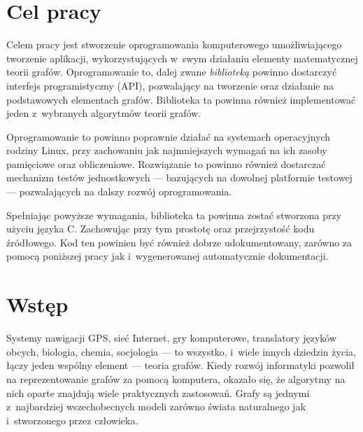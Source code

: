 \documentclass[a4paper,12pt,polish,twoside,openright]{thesis}
\makeatletter
\def\cleardoublepage{\clearpage\if@twoside \ifodd\c@page\else
\hbox{}
\vspace*{\fill}
\vspace{\fill}
\thispagestyle{plain}
\newpage
\if@twocolumn\hbox{}\newpage\fi\fi\fi}
\makeatother
\begin{document}
\stronaTytulowa

\cleardoublepage
\thispagestyle{empty}
\vspace*{\fill}
\begin{flushright}
\begin{minipage}{1.0\textwidth}
\end{minipage}
\end{flushright}

\tableofcontents

\chapter*{Cel pracy}
Celem pracy jest stworzenie oprogramowania komputerowego umożliwiającego tworzenie aplikacji, wykorzystujących w~swym działaniu elementy matematycznej teorii grafów.
Oprogramowanie to, dalej zwane \emph{biblioteką} powinno dostarczyć interfejs programistyczny (API), pozwalający na tworzenie oraz działanie na podstawowych elementach grafów.
Biblioteka ta powinna również implementować jeden z~wybranych algorytmów teorii grafów.

Oprogramowanie to powinno poprawnie działać na systemach operacyjnych rodziny Linux, przy zachowaniu jak najmniejszych wymagań na ich zasoby pamięciowe oraz obliczeniowe.
Rozwiązanie to powinno również dostarczać mechanizm testów jednostkowych --- bazujących na dowolnej platformie testowej --- pozwalających na dalszy rozwój oprogramowania.

Spełniając powyższe wymagania, biblioteka ta powinna zostać stworzona przy użyciu języka C. Zachowując przy tym prostotę oraz przejrzystość kodu źródłowego.
Kod ten powinien być również dobrze udokumentowany, zarówno za pomocą poniższej pracy jak i~wygenerowanej automatycznie dokumentacji.

\chapter*{Wstęp}
Systemy nawigacji GPS, sieć Internet, gry komputerowe, translatory języków obcych, biologia, chemia, socjologia --- to wszystko, i~wiele innych dziedzin życia, łączy jeden wspólny element --- teoria grafów.
Kiedy rozwój informatyki pozwolił na reprezentowanie grafów za pomocą komputera, okazało się, że algorytmy na nich oparte znajdują wiele praktycznych zastosowań.
Grafy są jednymi z~najbardziej wszechobecnych modeli zarówno świata naturalnego jak i~stworzonego przez człowieka.
\end{document}
